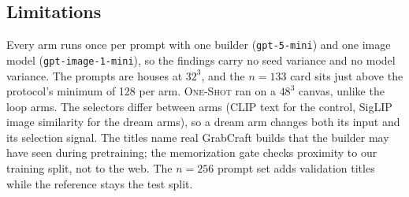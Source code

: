 \subsection{Limitations}

Every arm runs once per prompt with one builder (\texttt{gpt-5-mini}) and one image model (\texttt{gpt-image-1-mini}), so the findings carry no seed variance and no model variance. %
The prompts are houses at $32^3$, and the $n{=}133$ card sits just above the protocol's minimum of 128 per arm. %
\textsc{One-Shot} ran on a $48^3$ canvas, unlike the loop arms. %
The selectors differ between arms (CLIP text for the control, SigLIP image similarity for the dream arms), so a dream arm changes both its input and its selection signal. %
The titles name real GrabCraft builds that the builder may have seen during pretraining; the memorization gate checks proximity to our training split, not to the web. %
The $n{=}256$ prompt set adds validation titles while the reference stays the test split. %
